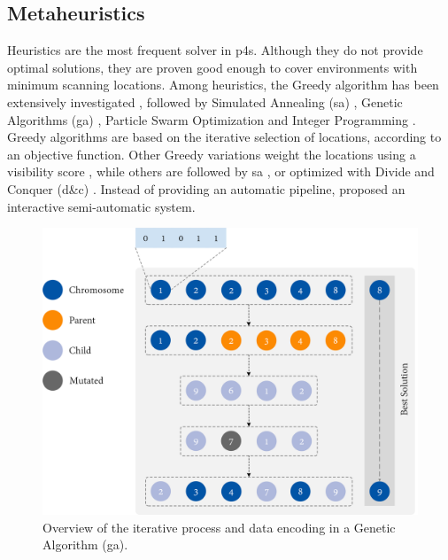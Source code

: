 \subsection{Metaheuristics}

Heuristics are the most frequent solver in \acrshort{p4s}. Although they do not provide optimal solutions, they are proven good enough to cover environments with minimum scanning locations. Among heuristics, the Greedy algorithm has been extensively investigated \cite{zhang_rapid_2016, giorgini_sensor-based_2019, heidari_mozaffar_optimal_2016}, followed by Simulated Annealing (\acrshort{sa}) \cite{chen_indoor_2018}, Genetic Algorithms (\acrshort{ga}) \cite{jia_comparison_2017}, Particle Swarm Optimization \cite{jia_comparison_2017} and Integer Programming \cite{wakisaka_optimal_2019}. Greedy algorithms are based on the iterative selection of locations, according to an objective function. Other Greedy variations weight the locations using a visibility score \cite{jia_comparison_2017}, while others are followed by \acrshort{sa} \cite{latimer_sensor_2004}, or optimized with Divide and Conquer (\acrshort{d&c}) \cite{zhang_rapid_2016}. Instead of providing an automatic pipeline, \cite{ahn_interactive_2016} proposed an interactive semi-automatic system.

\begin{figure}[ht]
	\includegraphics[width=\linewidth]{figs/context/genetic_algorithm.png}
	\caption{Overview of the iterative process and data encoding in a Genetic Algorithm (\acrshort{ga}). }
    \label{fig:genetic_algorithm}
\end{figure}


